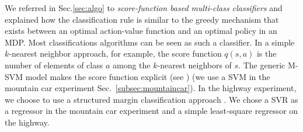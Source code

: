 \documentclass{llncs}
\begin{document}
We referred in Sec.\ref{sec:algo} to \emph{score-function based multi-class classifiers} and explained how the classification rule is similar to the greedy mechanism that exists between an optimal action-value function and an optimal policy in an MDP. Most classifications algorithms can be seen as such a classifier. In a simple $k$-nearest neighbor approach, for example, the score function $q(s,a)$ is the number of elements of class $a$ among the $k$-nearest neighbors of $s$. The generic M-SVM model makes the score function explicit (see \cite{guermeur2011generic}) (we use a SVM in the mountain car experiment Sec.~\ref{subsec:mountaincar}). In the highway experiment, we choose to use a structured margin classification approach \cite{taskar2005learning}.
We chose a SVR as a regressor in the mountain car experiment and a simple least-square regressor on the highway.
\end{document}

